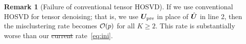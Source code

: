 \documentclass[twoside]{article}
\theoremstyle{definition}
\theoremstyle{definition}
\newtheorem{rmk}{Remark}
\providecommand{\DIFaddtex}[1]{{\protect\color{blue}\uwave{#1}}} %
\providecommand{\DIFdeltex}[1]{{\protect\color{red}\sout{#1}}}                      %
\providecommand{\DIFaddbegin}{} %
\providecommand{\DIFaddend}{} %
\providecommand{\DIFdelbegin}{} %
\providecommand{\DIFdelend}{} %
\providecommand{\DIFadd}[1]{\texorpdfstring{\DIFaddtex{#1}}{#1}} %
\providecommand{\DIFdel}[1]{\texorpdfstring{\DIFdeltex{#1}}{}} %
\newcommand{\DIFscaledelfig}{0.5}
\newlength{\DIFdelgraphicswidth} %
\newlength{\DIFdelgraphicsheight} %
\newcommand{\DIFaddincludegraphics}[2][]{{\color{blue}\fbox{\DIFOincludegraphics[#1]{#2}}}} %
\newcommand{\DIFdelincludegraphics}[2][]{%
\sbox{\DIFdelgraphicsbox}{\DIFOincludegraphics[#1]{#2}}%
\settoboxwidth{\DIFdelgraphicswidth}{\DIFdelgraphicsbox} %
\settoboxtotalheight{\DIFdelgraphicsheight}{\DIFdelgraphicsbox} %
\scalebox{\DIFscaledelfig}{%
\parbox[b]{\DIFdelgraphicswidth}{\usebox{\DIFdelgraphicsbox}\\[-\baselineskip] \rule{\DIFdelgraphicswidth}{0em}}\llap{\resizebox{\DIFdelgraphicswidth}{\DIFdelgraphicsheight}{%
\setlength{\unitlength}{\DIFdelgraphicswidth}%
\begin{picture}(1,1)%
\thicklines\linethickness{2pt} %
{\color[rgb]{1,0,0}\put(0,0){\framebox(1,1){}}}%
{\color[rgb]{1,0,0}\put(0,0){\line( 1,1){1}}}%
{\color[rgb]{1,0,0}\put(0,1){\line(1,-1){1}}}%
\end{picture}%
}\hspace*{3pt}}} %
} %
\DeclareRobustCommand{\DIFaddbegin}{\DIFOaddbegin \let\includegraphics\DIFaddincludegraphics} %
\DeclareRobustCommand{\DIFaddend}{\DIFOaddend \let\includegraphics\DIFOincludegraphics} %
\DeclareRobustCommand{\DIFdelbegin}{\DIFOdelbegin \let\includegraphics\DIFdelincludegraphics} %
\DeclareRobustCommand{\DIFdelend}{\DIFOaddend \let\includegraphics\DIFOincludegraphics} %
\begin{document}
\DIFaddbegin \thispagestyle{empty}

\DIFaddend \begin{rmk}[Failure of conventional tensor HOSVD] If we use conventional HOSVD for tensor denoising; that is, we use $\bm{U}_{\text{pre}}$ in place of $\hat {\bm{U}}$ in line 2, then the misclustering rate becomes \DIFdelbegin \DIFdel{$\mathcal{O}(p)$ }\DIFdelend \DIFaddbegin \DIFadd{$\tO(p^{-1})$ }\DIFaddend for all $K\geq 2$. This rate is substantially worse than our \DIFdelbegin \DIFdel{current }\DIFdelend rate~\eqref{eq:ini}.
\end{rmk}


\DIFdelbegin %
\DIFdelend %
\DIFaddbegin 
\end{document}
